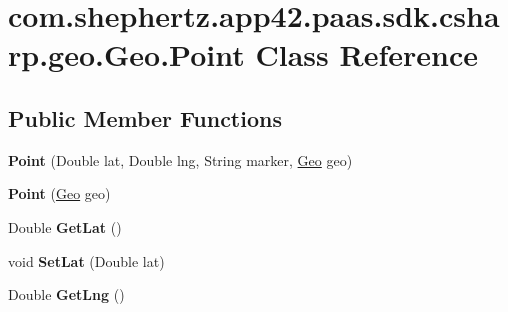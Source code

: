\hypertarget{classcom_1_1shephertz_1_1app42_1_1paas_1_1sdk_1_1csharp_1_1geo_1_1_geo_1_1_point}{\section{com.\+shephertz.\+app42.\+paas.\+sdk.\+csharp.\+geo.\+Geo.\+Point Class Reference}
\label{classcom_1_1shephertz_1_1app42_1_1paas_1_1sdk_1_1csharp_1_1geo_1_1_geo_1_1_point}
}
\subsection*{Public Member Functions}
\begin{DoxyCompactItemize}
\item 
\hypertarget{classcom_1_1shephertz_1_1app42_1_1paas_1_1sdk_1_1csharp_1_1geo_1_1_geo_1_1_point_a79849ed1b923cd9c06c606efaf212ee4}{{\bfseries Point} (Double lat, Double lng, String marker, \hyperlink{classcom_1_1shephertz_1_1app42_1_1paas_1_1sdk_1_1csharp_1_1geo_1_1_geo}{Geo} geo)}\label{classcom_1_1shephertz_1_1app42_1_1paas_1_1sdk_1_1csharp_1_1geo_1_1_geo_1_1_point_a79849ed1b923cd9c06c606efaf212ee4}

\item 
\hypertarget{classcom_1_1shephertz_1_1app42_1_1paas_1_1sdk_1_1csharp_1_1geo_1_1_geo_1_1_point_a2a85664e29acc137dc2e34728795a14f}{{\bfseries Point} (\hyperlink{classcom_1_1shephertz_1_1app42_1_1paas_1_1sdk_1_1csharp_1_1geo_1_1_geo}{Geo} geo)}\label{classcom_1_1shephertz_1_1app42_1_1paas_1_1sdk_1_1csharp_1_1geo_1_1_geo_1_1_point_a2a85664e29acc137dc2e34728795a14f}

\item 
\hypertarget{classcom_1_1shephertz_1_1app42_1_1paas_1_1sdk_1_1csharp_1_1geo_1_1_geo_1_1_point_abf58e760da3f81554714e45fa5cf880f}{Double {\bfseries Get\+Lat} ()}\label{classcom_1_1shephertz_1_1app42_1_1paas_1_1sdk_1_1csharp_1_1geo_1_1_geo_1_1_point_abf58e760da3f81554714e45fa5cf880f}

\item 
\hypertarget{classcom_1_1shephertz_1_1app42_1_1paas_1_1sdk_1_1csharp_1_1geo_1_1_geo_1_1_point_a729e9a1f53b984ae0da36862b5a3cc04}{void {\bfseries Set\+Lat} (Double lat)}\label{classcom_1_1shephertz_1_1app42_1_1paas_1_1sdk_1_1csharp_1_1geo_1_1_geo_1_1_point_a729e9a1f53b984ae0da36862b5a3cc04}

\item 
\hypertarget{classcom_1_1shephertz_1_1app42_1_1paas_1_1sdk_1_1csharp_1_1geo_1_1_geo_1_1_point_a228baa75226b0b60532193bda8f4f7dd}{Double {\bfseries Get\+Lng} ()}\label{classcom_1_1shephertz_1_1app42_1_1paas_1_1sdk_1_1csharp_1_1geo_1_1_geo_1_1_point_a228baa75226b0b60532193bda8f4f7dd}


\end{DoxyCompactItemize}
